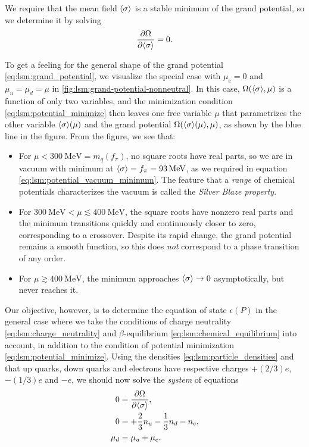 We require that the mean field $\langle \sigma \rangle$ is a stable minimum of the grand potential,
so we determine it by solving
\begin{equation}
	\pdv{\Omega}{ \langle \sigma \rangle} = 0.
\label{eq:lsm:potential_minimize}
\end{equation}

To get a feeling for the general shape of the grand potential \eqref{eq:lsm:grand_potential}, we visualize the special case with $\mu_e = 0$ and $\mu_u = \mu_d = \mu$ in \cref{fig:lsm:grand-potential-nonneutral}.
In this case, $\Omega(\langle \sigma \rangle,\mu)$ is a function of only two variables, and the minimization condition \eqref{eq:lsm:potential_minimize} then leaves one free variable $\mu$ that parametrizes the other variable $\langle \sigma \rangle(\mu)$ and the grand potential $\Omega(\langle \sigma \rangle(\mu),\mu)$, as shown by the blue line in the figure.
From the figure, we see that:
\begin{itemize}
\item For $\mu < \SI{300}{\mega\electronvolt} = m_q(f_\pi)$, no square roots have real parts, so we are in vacuum with minimum at $\langle \sigma \rangle = f_\pi = \SI{93}{\mega\electronvolt}$, as we required in equation \eqref{eq:lsm:potential_vacuum_minimum}.
      The feature that a \emph{range} of chemical potentials characterizes the vacuum is called the \emph{Silver Blaze property}.
\item For $\SI{300}{\mega\electronvolt} < \mu \lesssim \SI{400}{\mega\electronvolt}$, the square roots have nonzero real parts and the minimum transitions quickly and continuously closer to zero, corresponding to a crossover.
      Despite its rapid change, the grand potential remains a smooth function, so this does \emph{not} correspond to a phase transition of any order.
\item For $\mu \gtrsim \SI{400}{\mega\electronvolt}$, the minimum approaches $\langle \sigma \rangle \rightarrow 0$ asymptotically, but never reaches it.
\end{itemize}
Our objective, however, is to determine the equation of state $\epsilon(P)$ in the general case where we take the conditions of charge neutrality \eqref{eq:lsm:charge_neutrality} and $\beta$-equilibrium \eqref{eq:lsm:chemical_equilibrium} into account, in addition to the condition of potential minimization \eqref{eq:lsm:potential_minimize}.
Using the densities \eqref{eq:lsm:particle_densities} and that up quarks, down quarks and electrons have respective charges $+(2/3)e$, $-(1/3)e$ and $-e$, we should now solve the \emph{system} of equations
\begin{subequations}
\begin{align}
	0 &= \pdv{\Omega}{ \langle \sigma \rangle} , \label{eq:lsm:minsys_min} \\
	0 &= +\frac23 n_u - \frac13 n_d - n_e , \label{eq:lsm:minsys_charge} \\
	\mu_d &= \mu_u + \mu_e . \label{eq:lsm:minsys_equilibrium}
\end{align}%
\label{eq:lsm:minsys}%
\end{subequations}%
